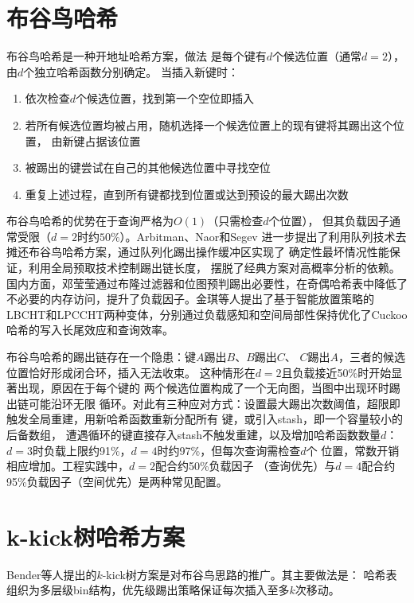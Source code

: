 \documentclass[
    type = bachelor,
    fontset = win,
    decl-page = true,
  ]{njuthesis}
\begin{document}
\section{布谷鸟哈希}

布谷鸟哈希\cite{4}是一种开地址哈希方案，做法
是每个键有$d$个候选位置（通常$d=2$），由$d$个独立哈希函数分别确定。
当插入新键时：
\begin{enumerate}
  \item 依次检查$d$个候选位置，找到第一个空位即插入
  \item 若所有候选位置均被占用，随机选择一个候选位置上的现有键将其踢出这个位置，
    由新键占据该位置
  \item 被踢出的键尝试在自己的其他候选位置中寻找空位
  \item 重复上述过程，直到所有键都找到位置或达到预设的最大踢出次数
\end{enumerate}

布谷鸟哈希的优势在于查询严格为$O(1)$（只需检查$d$个位置），
但其负载因子通常受限（$d=2$时约$50\%$）。Arbitman、Naor和Segev\cite{8}
进一步提出了利用队列技术去摊还布谷鸟哈希方案，通过队列化踢出操作缓冲区实现了
确定性最坏情况性能保证，利用全局预取技术\cite{9}控制踢出链长度，
摆脱了经典方案对高概率分析的依赖。国内方面，邓莹莹\cite{27}通过布隆过滤器和位图预判踢出必要性，在奇偶哈希表中降低了不必要的内存访问，提升了负载因子。金琪等人\cite{28}提出了基于智能放置策略的LBCHT和LPCCHT两种变体，分别通过负载感知和空间局部性保持优化了Cuckoo哈希的写入长尾效应和查询效率。

布谷鸟哈希的踢出链存在一个隐患：键$A$踢出$B$、$B$踢出$C$、
$C$踢出$A$，三者的候选位置恰好形成闭合环，插入无法收束。
这种情形在$d=2$且负载接近50\%时开始显著出现，原因在于每个键的
两个候选位置构成了一个无向图，当图中出现环时踢出链可能沿环无限
循环。对此有三种应对方式：设置最大踢出次数阈值，超限即触发全局重建，用新哈希函数重新分配所有
键，或引入stash，即一个容量较小的后备数组，
遭遇循环的键直接存入stash不触发重建，以及增加哈希函数数量$d$：
$d=3$时负载上限约91\%，$d=4$时约97\%\cite{26}，但每次查询需检查$d$个
位置，常数开销相应增加。工程实践中，$d=2$配合约50\%负载因子
（查询优先）与$d=4$配合约95\%负载因子（空间优先）是两种常见配置。

\section{k-kick树哈希方案}

Bender等人\cite{1}提出的$k$-kick树方案是对布谷鸟思路的推广。其主要做法是：
哈希表组织为多层级bin结构，优先级踢出策略保证每次插入至多$k$次移动。
\end{document}
